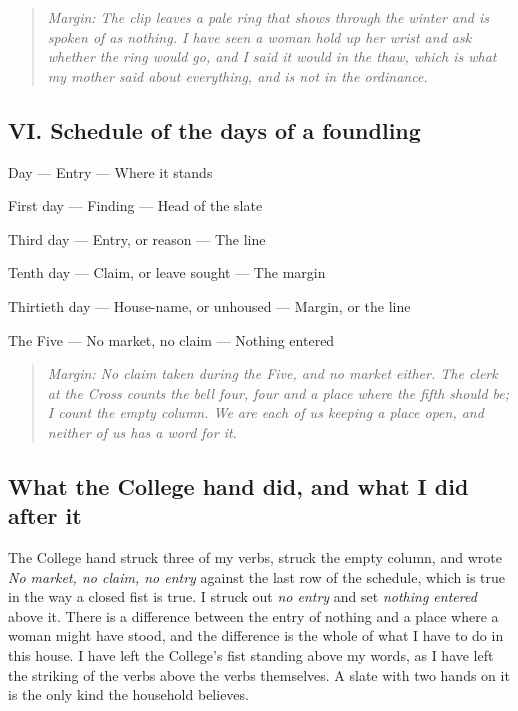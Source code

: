 \documentclass{design/chronicle}
\begin{document}
\begin{quote}\itshape \emph{Margin:} The clip leaves a pale ring that shows through the winter and is spoken of as nothing. I have seen a woman hold up her wrist and ask whether the ring would go, and I said it would in the thaw, which is what my mother said about everything, and is not in the ordinance.\end{quote}

\subsection*{VI. Schedule of the days of a foundling}

Day — Entry — Where it stands\par

First day — Finding — Head of the slate\par

Third day — Entry, or reason — The line\par

Tenth day — Claim, or leave sought — The margin\par

Thirtieth day — House-name, or unhoused — Margin, or the line\par

The Five — No market, no claim — Nothing entered\par

\begin{quote}\itshape \emph{Margin:} No claim taken during the Five, and no market either. The clerk at the Cross counts the bell four, four and a place where the fifth should be; I count the empty column. We are each of us keeping a place open, and neither of us has a word for it.\end{quote}

\subsection*{What the College hand did, and what I did after it}

The College hand struck three of my verbs, struck the empty column, and wrote \emph{No market, no claim, no entry} against the last row of the schedule, which is true in the way a closed fist is true. I struck out \emph{no entry} and set \emph{nothing entered} above it. There is a difference between the entry of nothing and a place where a woman might have stood, and the difference is the whole of what I have to do in this house. I have left the College’s fist standing above my words, as I have left the striking of the verbs above the verbs themselves. A slate with two hands on it is the only kind the household believes.
\end{document}
